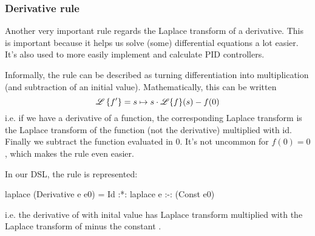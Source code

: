 \subsubsection{Derivative rule}
Another very important rule regards the Laplace transform of a derivative. This
is important because it helps us solve (some) differential equations a lot
easier. It's also used to more easily implement and calculate PID controllers.

Informally, the rule can be described as turning differentiation into
multiplication (and subtraction of an initial value). 
Mathematically, this can be written
\begin{equation*}
  \mathscr{L}\left\{f'\right\} = s \mapsto s \cdot \mathscr{L}\{f\}(s) - f(0)
\end{equation*}
i.e. if we have a derivative of a function, the corresponding Laplace transform
is the Laplace transform of the function (not the derivative) multiplied with
id. Finally we subtract the function evaluated in 0. It's not uncommon for $f(0)
= 0$, which makes the rule even easier. 
 
In our DSL, the rule is represented:
\begin{code}
laplace (Derivative e e0) = Id :*: laplace e :-: (Const e0) 
\end{code}
i.e. the derivative of  with inital value  has Laplace transform  multiplied
with the Laplace transform of  minus the constant .


